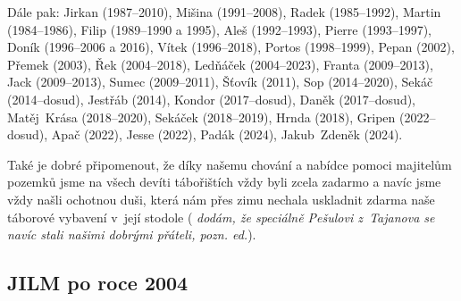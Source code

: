 \documentclass[a5paper, 11pt, twoside]{article}
\newcommand{\pozned}[1]{%
\textit{#1}}
\begin{document}
{\sloppy Dále pak: \mbox{Jirkan} (1987--2010), \mbox{Mišina} (1991--2008), \mbox{Radek} (1985--1992),
\mbox{Martin} (1984--1986), \mbox{Filip} (1989--1990 a 1995), \mbox{Aleš} (1992--1993),
\mbox{Pierre} (1993--1997), \mbox{Doník} (1996--2006 a 2016), \mbox{Vítek} (1996--2018),
\mbox{Portos} (1998--1999), \mbox{Pepan} (2002), \mbox{Přemek} (2003), \mbox{Řek} (2004--2018),
\mbox{Ledňáček} (2004--2023), \mbox{Franta} (2009--2013), \mbox{Jack} (2009--2013), \mbox{Sumec}
(2009--2011), \mbox{Šťovík} (2011), \mbox{Sop} (2014--2020), \mbox{Sekáč} (2014--dosud),
\mbox{Jestřáb} (2014), \mbox{Kondor} (2017--dosud), \mbox{Daněk} (2017--dosud), \mbox{Matěj Krása}
(2018--2020), \mbox{Sekáček} (2018--2019), \mbox{Hrnda} (2018),
\mbox{Gripen} (2022--dosud),
\mbox{Apač} (2022), \mbox{Jesse} (2022), \mbox{Padák} (2024), \mbox{Jakub Zdeněk} (2024).\par}

Také je dobré připomenout, že díky našemu chování a nabídce pomoci
majitelům pozemků jsme na všech devíti tábořištích vždy byli zcela
zadarmo a navíc jsme vždy našli ochotnou duši, která nám přes zimu
nechala uskladnit zdarma naše táborové vybavení v~její stodole
(\pozned{dodám, že speciálně Pešulovi z~Tajanova se navíc stali našimi
dobrými přáteli, pozn. ed.}).

\subsection{JILM po roce 2004}
\end{document}
